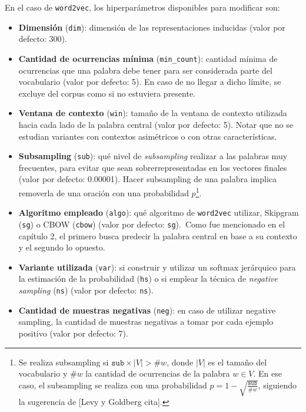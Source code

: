 En el caso de \texttt{word2vec}, los hiperparámetros disponibles para modificar son:

\begin{itemize}

\item \textbf{Dimensión} (\texttt{dim}): dimensión de las representaciones inducidas (valor por
defecto: 300).

\item \textbf{Cantidad de ocurrencias mínima} (\texttt{min\_count}): cantidad mínima de ocurrencias
que una palabra debe tener para ser considerada parte del vocabulario (valor por defecto: 5). En
caso de no llegar a dicho límite, se excluye del corpus como si no estuviera presente.

\item \textbf{Ventana de contexto} (\texttt{win}): tamaño de la ventana de contexto utilizada hacia
cada lado de la palabra central (valor por defecto: 5). Notar que no se estudian variantes con
contextos asimétricos o con otras características.

\item \textbf{Subsampling} (\texttt{sub}): qué nivel de \textit{subsampling} realizar a las palabras
muy frecuentes, para evitar que sean sobrerrepresentadas en los vectores finales (valor por defecto:
0.00001). Hacer subsampling de una palabra implica removerla de una oración con una probabilidad
$p$\footnote{Se realiza subsampling si $\mathtt{sub} \times |V| > \#w$, donde $|V|$ es el tamaño del
vocabulario y $\#w$ la cantidad de ocurrencias de la palabra $w \in V$. En ese caso, el subsampling
se realiza con una probabilidad $p = 1 - \sqrt{\frac{\mathtt{sub}}{\#w}}$, siguiendo la sugerencia
de [Levy y Goldberg cita].}.

\item \textbf{Algoritmo empleado} (\texttt{algo}): qué algoritmo de \texttt{word2vec} utilizar,
Skipgram (\texttt{sg}) o CBOW (\texttt{cbow}) (valor por defecto: \texttt{sg}).\ Como fue mencionado
en el capítulo 2, el primero busca predecir la palabra central en base a su contexto y el segundo lo
opuesto.

\item \textbf{Variante utilizada} (\texttt{var}): si construir y utilizar un softmax jerárquico para
la estimación de la probabilidad (\texttt{hs}) o si emplear la técnica de \textit{negative sampling}
(\texttt{ns}) (valor por defecto: \texttt{ns}).

\item \textbf{Cantidad de muestras negativas} (\texttt{neg}): en caso de utilizar negative sampling,
la cantidad de muestras negativas a tomar por cada ejemplo positivo (valor por defecto: 7).


\end{itemize}
